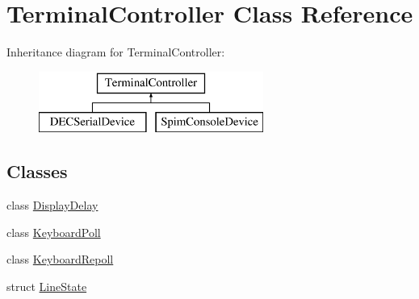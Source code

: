 \hypertarget{classTerminalController}{
\section{TerminalController Class Reference}
\label{classTerminalController}
}
Inheritance diagram for TerminalController:\begin{figure}[H]
\begin{center}
\leavevmode
\includegraphics[height=2cm]{classTerminalController}
\end{center}
\end{figure}
\subsection*{Classes}
\begin{DoxyCompactItemize}
\item 
class \hyperlink{classTerminalController_1_1DisplayDelay}{DisplayDelay}
\item 
class \hyperlink{classTerminalController_1_1KeyboardPoll}{KeyboardPoll}
\item 
class \hyperlink{classTerminalController_1_1KeyboardRepoll}{KeyboardRepoll}
\item 
struct \hyperlink{structTerminalController_1_1LineState}{LineState}
\end{DoxyCompactItemize}
